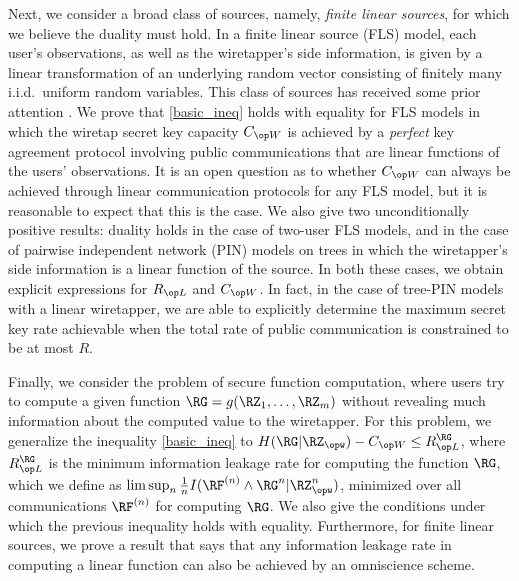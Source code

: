 Next, we consider a broad class of sources, namely, \emph{finite linear sources}, for which we believe the duality must hold. In a finite linear source (FLS) model, each user's observations, as well as the wiretapper's side information, is given by a linear transformation of an underlying random vector consisting of finitely many i.i.d.\ uniform random variables. This class of sources has received some prior attention \cite{chan11itw,chan11delay,chan19oneshot}. We prove that \eqref{basic_ineq} holds with equality for FLS models in which the wiretap secret key capacity $\wskc$ is achieved by a \emph{perfect} key agreement protocol involving public communications that are linear functions of the users' observations. It is an open question as to whether $\wskc$ can always be achieved through linear communication protocols for any FLS model, but it is reasonable to expect that this is the case. We also give two unconditionally positive results: duality holds in the case of two-user FLS models, and in the case of pairwise independent network (PIN) models on trees \cite{sirinpin, sirinperfect} in which the wiretapper's side information is a linear function of the source. In both these cases, we obtain explicit expressions for $\rl$ and $\wskc$. In fact, in the case of tree-PIN models with a linear wiretapper, we are able to explicitly determine the maximum secret key rate achievable when the total rate of public communication is constrained to be at most $R$.

{ Finally, we consider the problem of secure function computation, where users try to compute a given function $\RG=g(\RZ_1,\ldots, \RZ_m)$ without revealing much information about the computed value to the wiretapper. For this problem, we generalize the inequality \eqref{basic_ineq} to $H(\RG|\RZ_{\opw}) - \wskc \leq \rl^{\RG}$, where $\rl^{\RG}$ is the minimum information leakage rate for computing the function $\RG$, which we define as $\limsup_n\frac{1}{n}I(\RF^{(n)} \wedge \RG^n|\RZ_{\opw}^n)$, minimized over all communications $\RF^{(n)}$ for computing $\RG$. We also give the conditions under which the previous inequality holds with equality. Furthermore, for finite linear sources, we prove a result that says that any information leakage rate in computing a linear function can also be achieved by an omniscience scheme.}


